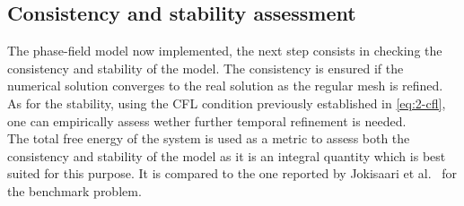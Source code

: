 \subsection{Consistency and stability assessment}
    The phase-field model now implemented, the next step consists in checking the consistency and stability of the model. The consistency is ensured if the numerical solution converges to the real solution as the regular mesh is refined. As for the stability, using the CFL condition previously established in \autoref{eq:2-cfl}, one can empirically assess wether further temporal refinement is needed.\\
    The total free energy of the system is used as a metric to assess both the consistency and stability of the model as it is an integral quantity which is best suited for this purpose. It is compared to the one reported by Jokisaari et al.\ \cite{JokisaariVoorheesGuyerWarrenHeinonen2017} for the benchmark problem.
